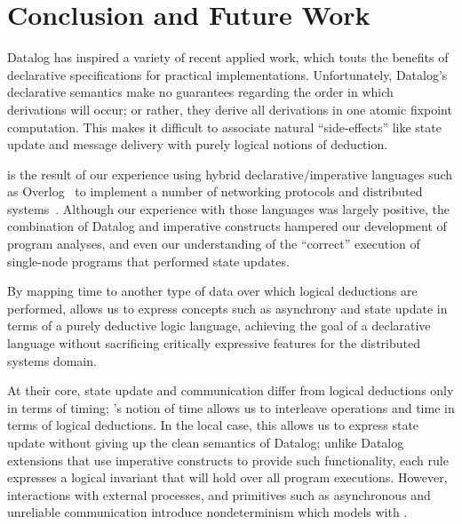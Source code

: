 \section{Conclusion and Future Work}

Datalog has inspired a variety of recent applied work, which touts the benefits of declarative specifications for practical implementations.  Unfortunately, Datalog's declarative semantics make no guarantees
regarding the order in which derivations will occur; or rather, they derive all derivations in one atomic fixpoint computation.  This makes it difficult to associate natural ``side-effects'' like state update and message delivery with purely logical notions of deduction.


\lang is the result of our experience using hybrid
declarative/imperative languages such as Overlog~\cite{Loo2009-CACM}
to implement a number of networking protocols and distributed
systems~\cite{boom-techr,Alvaro2009I-Do-Declare:-C,Chu:2007,Loo2009-CACM}.
Although our experience with those languages was largely positive, the
combination of Datalog and imperative constructs hampered our
development of program analyses, and even our understanding of the
``correct'' execution of single-node programs that performed state
updates.

By mapping time to another type of data over which logical deductions
are performed, \lang allows us to express concepts such as asynchrony and state update in terms of a purely deductive logic
language, achieving the goal of a declarative language without sacrificing critically expressive features for the distributed systems domain.

At their core, state update and communication differ from logical
deductions only in terms of timing; \lang's notion of time allows us
to interleave operations and time in terms of logical deductions.
In the local case, this allows us to express state update without giving up the clean semantics of Datalog; unlike
Datalog extensions that use imperative constructs to provide such
functionality, each \lang rule expresses a logical invariant that will
hold over all program executions.  
However, interactions with external processes, and primitives such as
asynchronous and unreliable communication introduce nondeterminism
which \lang models with .  

